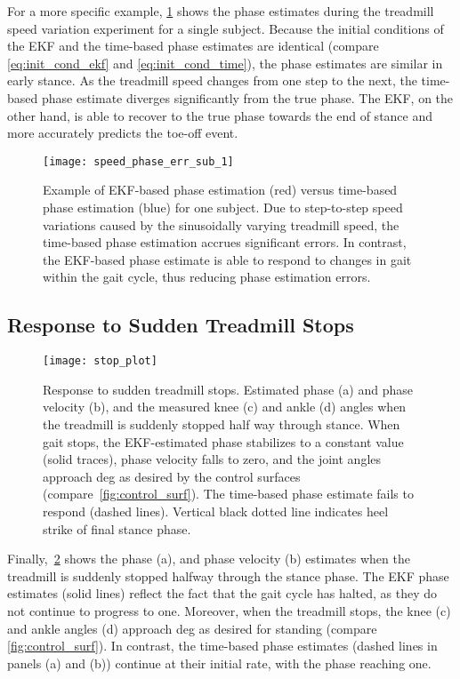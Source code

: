 For a more specific example, \cref{fig:speed_phase_est_sub_1} shows the phase
estimates during the treadmill speed variation experiment for a single subject.
Because the initial conditions of the EKF and the time-based phase estimates are
identical (compare \cref{eq:init_cond_ekf} and \cref{eq:init_cond_time}), the
phase estimates are similar in early stance. As the treadmill speed changes from
one step to the next, the time-based phase estimate diverges significantly from
the true phase. The EKF, on the other hand, is able to recover to the true phase
towards the end of stance and more accurately predicts the toe-off event.
\begin{figure}[t]
    \centering
    \texttt{[image: speed\_phase\_err\_sub\_1]} 
    \caption[Example of EKF-based phase estimation versus time-based phase
    estimation for one subject]{Example of EKF-based phase estimation (red)
    versus time-based phase estimation (blue) for one subject. Due to
    step-to-step speed variations caused by the sinusoidally varying treadmill
    speed, the time-based phase estimation accrues significant errors.  In
    contrast, the EKF-based phase estimate is able to respond to changes in gait
    within the gait cycle, thus reducing phase estimation
    errors.}\label{fig:speed_phase_est_sub_1}
\end{figure}

\subsection{Response to Sudden Treadmill Stops}
\begin{figure}[t]
    \centering
    \texttt{[image: stop\_plot]} 
    \caption[Response to sudden treadmill stops]{Response to sudden treadmill
    stops. Estimated phase (a) and phase velocity (b), and the measured knee (c)
    and ankle (d) angles when the treadmill is suddenly stopped half way through
    stance.  When gait stops, the EKF-estimated phase stabilizes to a constant
    value (solid traces), phase velocity falls to zero, and the joint angles
    approach \unit[5]{deg} as desired by the control surfaces
    (compare~\cref{fig:control_surf}). The time-based phase estimate fails to
    respond (dashed lines). Vertical black dotted line indicates heel strike of
    final stance phase.}\label{fig:stop_plot}
\end{figure}

Finally,~\cref{fig:stop_plot} shows the phase (a), and phase velocity (b)
estimates when the treadmill is suddenly stopped halfway through the stance
phase. The EKF phase estimates (solid lines) reflect the fact that the gait
cycle has halted, as they do not continue to progress to one. Moreover, when
the treadmill stops, the knee (c) and ankle angles (d) approach \unit[5]{deg} as
desired for standing (compare \cref{fig:control_surf}). In contrast, the
time-based phase estimates (dashed lines in panels (a) and (b)) continue at
their initial rate, with the phase reaching one. 
